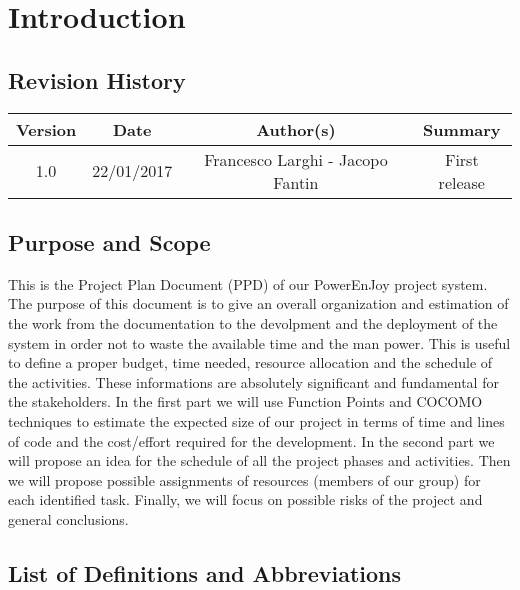 \chapter{Introduction}

\section{Revision History}

\begin{table}[htbp]
\begin{center}
\begin{tabular}[t]{cccc}

\hline
Version & Date & Author(s) & Summary\\
\hline
1.0 & 22/01/2017 & Francesco Larghi - Jacopo Fantin & First release\\
\hline

\end{tabular}
\end{center}
\end{table}

\section{Purpose and Scope}

This is the Project Plan Document (PPD) of our PowerEnJoy project system. 
\newline
The purpose of this document is to give an overall organization and estimation of the work from the documentation to the devolpment and the deployment of the system in order not to waste the available time and the man power.
This is useful to define a proper budget, time needed, resource allocation and the schedule of the activities.
These informations are absolutely significant and fundamental for the stakeholders.
\newline
In the first part we will use Function Points and COCOMO techniques to estimate the expected size of our project in terms of time and lines of code and the cost/effort required for the development.
\newline
In the second part we will propose an idea for the schedule of all the project phases and activities.
\newline
Then we will propose possible assignments of resources (members of our group) for each identified task.
Finally, we will focus on possible risks of the project and general conclusions.


\section{List of Definitions and Abbreviations}

